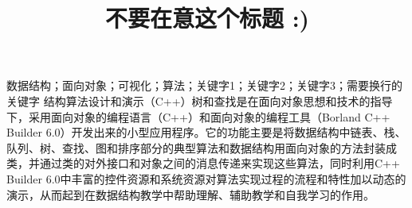 \documentclass[supercite,fontset=windows]{../../upcthesis}
\title{不要在意这个标题 :)}
\begin{document}


\begin{cnabstract}{数据结构；面向对象；可视化；算法；关键字1；关键字2；关键字3；需要换行的关键字}
结构算法设计和演示（C++）树和查找是在面向对象思想和技术的指导下，采用面向对象的编程语言（C++）和面向对象的编程工具（Borland C++ Builder 6.0）开发出来的小型应用程序。它的功能主要是将数据结构中链表、栈、队列、树、查找、图和排序部分的典型算法和数据结构用面向对象的方法封装成类，并通过类的对外接口和对象之间的消息传递来实现这些算法，同时利用C++ Builder 6.0中丰富的控件资源和系统资源对算法实现过程的流程和特性加以动态的演示，从而起到在数据结构教学中帮助理解、辅助教学和自我学习的作用。
\end{cnabstract}
\end{document}
